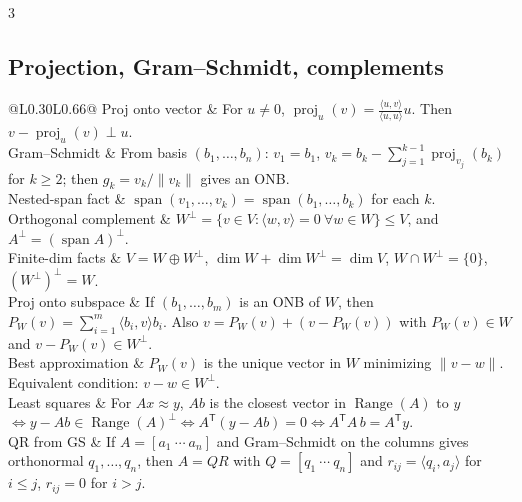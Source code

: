 \documentclass[10pt]{article}
\makeatletter
\newcommand{\Range}{\operatorname{Range}}
\newcommand{\spann}{\operatorname{span}}
\newcommand{\proj}{\operatorname{proj}}
\newcommand{\ip}[2]{\langle #1,#2\rangle}
\newcommand{\T}{^{\mathsf T}}
\newcommand{\cheattable}[1]{\begin{tabular}{@{}L{0.30\columnwidth}L{0.66\columnwidth}@{}}#1\end{tabular}}
\makeatother
\begin{document}
\begin{multicols}{3}
\subsection*{Projection, Gram--Schmidt, complements}
\cheattable{
Proj onto vector & For $u\neq 0$, $\proj_u(v)=\frac{\ip{u}{v}}{\ip{u}{u}}u$. Then $v-\proj_u(v)\perp u$.\\
Gram--Schmidt & From basis $(b_1,\dots,b_n)$: $v_1=b_1$, $v_k=b_k-\sum_{j=1}^{k-1}\proj_{v_j}(b_k)$ for $k\ge 2$; then $g_k=v_k/\|v_k\|$ gives an ONB.\\
Nested-span fact & $\spann(v_1,\dots,v_k)=\spann(b_1,\dots,b_k)$ for each $k$.\\
Orthogonal complement & $W^\perp=\{v\in V:\ip{w}{v}=0\ \forall w\in W\}\le V$, and $A^\perp=(\spann A)^\perp$.\\
Finite-dim facts & $V=W\oplus W^\perp$, $\dim W+\dim W^\perp=\dim V$, $W\cap W^\perp=\{0\}$, $(W^\perp)^\perp=W$.\\
Proj onto subspace & If $(b_1,\dots,b_m)$ is an ONB of $W$, then $P_W(v)=\sum_{i=1}^m\ip{b_i}{v}b_i$. Also $v=P_W(v)+(v-P_W(v))$ with $P_W(v)\in W$ and $v-P_W(v)\in W^\perp$.\\
Best approximation & $P_W(v)$ is the unique vector in $W$ minimizing $\|v-w\|$. Equivalent condition: $v-w\in W^\perp$.\\
Least squares & For $Ax\approx y$, $Ab$ is the closest vector in $\Range(A)$ to $y$ $\iff y-Ab\in\Range(A)^\perp \iff A\T(y-Ab)=0 \iff A\T A\,b=A\T y$.\\
QR from GS & If $A=[a_1\ \cdots\ a_n]$ and Gram--Schmidt on the columns gives orthonormal $q_1,\dots,q_n$, then $A=QR$ with $Q=[q_1\ \cdots\ q_n]$ and $r_{ij}=\ip{q_i}{a_j}$ for $i\le j$, $r_{ij}=0$ for $i>j$.\\
}


\end{multicols}
\end{document}

